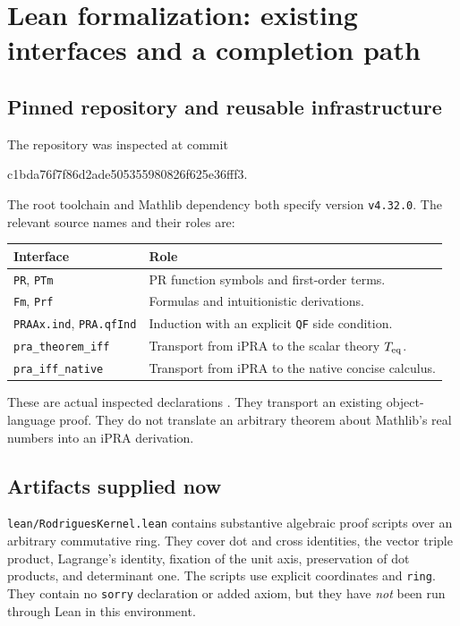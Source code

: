 \section{Lean formalization: existing interfaces and a completion path}
\label{sec:lean}

\subsection{Pinned repository and reusable infrastructure}
The repository was inspected at commit
\begin{center}\small\ttfamily
c1bda76f7f86d2ade505355980826f625e36fff3.
\end{center}
The root toolchain and Mathlib dependency both specify version
\texttt{v4.32.0}. The relevant source names and their roles are:
\begin{center}
\begin{tabular}{@{}p{}p{}@{}}
\toprule
Interface & Role \\
\midrule
\texttt{PR}, \texttt{PTm} & PR function symbols and first-order terms.\\
\texttt{Fm}, \texttt{Prf} & Formulas and intuitionistic derivations.\\
\texttt{PRAAx.ind}, \texttt{PRA.qfInd} & Induction with an explicit
\texttt{QF} side condition.\\
\texttt{pra\_theorem\_iff} & Transport from iPRA to the scalar theory
$T_{\rm eq}$.\\
\texttt{pra\_iff\_native} & Transport from iPRA to the native concise
calculus.\\
\bottomrule
\end{tabular}
\end{center}
These are actual inspected declarations \cite{proveit}. They transport
an existing object-language proof. They do not translate an arbitrary
theorem about Mathlib's real numbers into an iPRA derivation.

\subsection{Artifacts supplied now}
\texttt{lean/RodriguesKernel.lean} contains substantive algebraic proof
scripts over an arbitrary commutative ring. They cover dot and cross
identities, the vector triple product, Lagrange's identity, fixation of
the unit axis, preservation of dot products, and determinant one. The
scripts use explicit coordinates and \texttt{ring}. They contain no
\texttt{sorry} declaration or added axiom, but they have \emph{not} been
run through Lean in this environment.

